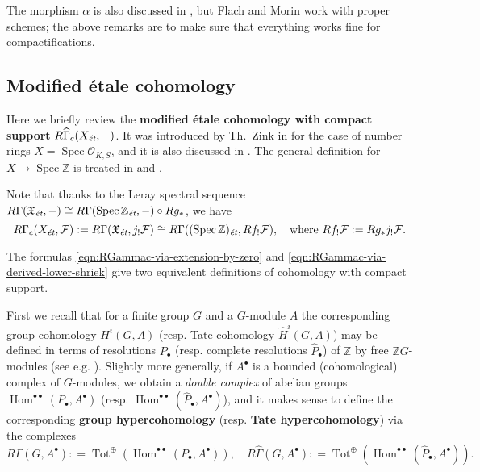 \documentclass[draft,leqno,12pt]{article}
\theoremstyle{plain}
\theoremstyle{definition}
\DeclareMathOperator{\Spec}{Spec}
\DeclareMathOperator{\Hom}{Hom}
\DeclareMathOperator{\Tot}{Tot}
\newcommand{\ZZ}{\mathbb{Z}}
\newcommand{\dfn}{\mathrel{\mathop:}=}
\newcommand{\et}{\text{\it \'{e}t}}
\begin{document}
The morphism $\alpha$ is also discussed in \cite[Appendix~A]{Flach-Morin-2018},
but Flach and Morin work with proper schemes; the above remarks are to make sure
that everything works fine for compactifications.

\subsection*{Modified \'{e}tale cohomology}

Here we briefly review the
\textbf{modified \'{e}tale cohomology with compact support}
$R\widehat{\Gamma}_c (X_\et, -)$. It was introduced by Th.~Zink in
\cite[Appendix~2]{Haberland-1978} for the case of number rings
$X = \Spec \mathcal{O}_{K,S}$, and it is also discussed in
\cite[\S II.2]{Milne-ADT}. The general definition for $X \to \Spec\ZZ$
is treated in \cite[\S 6.7]{Flach-Morin-2018} and
\cite[\S 2]{Geisser-Schmidt-2018}.

Note that thanks to the Leray spectral sequence
$R\Gamma (\mathfrak{X}_\et, -) \cong R\Gamma (\Spec \ZZ_\et, -)\circ R g_*$,
we have
\begin{equation}
  \label{eqn:RGammac-via-derived-lower-shriek}
  R\Gamma_c (X_\et, \mathcal{F}) \dfn R\Gamma (\mathfrak{X}_\et, j_!\mathcal{F})
  \cong R\Gamma ((\Spec \ZZ)_\et, R f_! \mathcal{F}), \quad
  \text{where } Rf_! \mathcal{F} \dfn R g_* j_! \mathcal{F}.
\end{equation}

The formulas \eqref{eqn:RGammac-via-extension-by-zero} and
\eqref{eqn:RGammac-via-derived-lower-shriek} give two equivalent definitions of
cohomology with compact support.

First we recall that for a finite group $G$ and a $G$-module $A$ the
corresponding group cohomology $H^i (G,A)$ (resp. Tate cohomology
$\widehat{H}^i (G,A)$) may be defined in terms of resolutions $P_\bullet$
(resp. complete resolutions $\widehat{P}_\bullet$) of $\ZZ$ by free
$\ZZ G$-modules (see e.g. \cite[Chapter~VI]{Brown-1994}). Slightly more
generally, if $A^\bullet$ is a bounded (cohomological) complex of
$G$-modules, we obtain a \emph{double complex} of abelian groups
$\Hom^{\bullet\bullet} (P_\bullet, A^\bullet)$ (resp.  $\Hom^{\bullet\bullet}
(\widehat{P}_\bullet, A^\bullet)$), and it makes sense to define the
corresponding \textbf{group hypercohomology}
(resp. \textbf{Tate hypercohomology}) via the complexes
\[ R\Gamma (G, A^\bullet) \dfn
\Tot^\oplus (\Hom^{\bullet\bullet} (P_\bullet, A^\bullet)), \quad
R\widehat{\Gamma} (G, A^\bullet) \dfn
\Tot^\oplus (\Hom^{\bullet\bullet} (\widehat{P}_\bullet, A^\bullet)). \]
\end{document}
